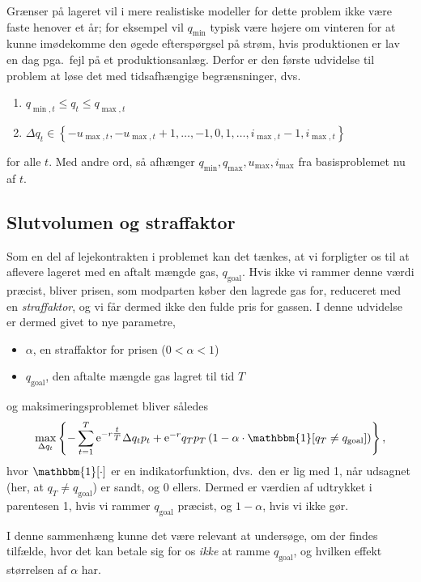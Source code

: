 \documentclass[12pt,oneside,final]{article}
\newcommand{\1}{\mathbbm{1}}
\newcommand{\e}{\mathrm{e}}
\begin{document}
Grænser på lageret vil i mere realistiske modeller for dette problem ikke være faste henover et år;
for eksempel vil \(q_{\min}\) typisk være højere om vinteren for at kunne imødekomme den øgede efterspørgsel på strøm, hvis produktionen er lav en dag pga.\ fejl på et produktionsanlæg.
Derfor er den første udvidelse til problem at løse det med tidsafhængige begrænsninger, dvs.\
%
\begin{enumerate}
\item \(q_{\min,t} \leq q_{t} \leq q_{\max,t}\)
\item \(\Delta q_{t} \in
    \left\{
    -u_{\max,t} , -u_{\max,t}+1 , \dotsc, -1, 0, 1, \dotsc, i_{\max,t} - 1 , i_{\max,t}
    \right\}\)
\end{enumerate}
%
for alle \(t\).
Med andre ord, så afhænger \(q_{\min}, q_{\max}, u_{\max}, i_{\max}\) fra basisproblemet nu af \(t\).


\subsection{Slutvolumen og straffaktor}

Som en del af lejekontrakten i problemet kan det tænkes, at vi forpligter os til at aflevere lageret med en aftalt mængde gas, \(q_{\mathrm{goal}}\).
Hvis ikke vi rammer denne værdi præcist, bliver prisen, som modparten køber den lagrede gas for, reduceret med en \emph{straffaktor}, og vi får dermed ikke den fulde pris for gassen.
I denne udvidelse er dermed givet to nye parametre,
%
\begin{itemize}
\item \(\alpha\), en straffaktor for prisen (\(0 < \alpha < 1\))
\item \(q_{\mathrm{goal}}\), den aftalte mængde gas lagret til tid \(T\)
\end{itemize}
%
og maksimeringsproblemet bliver således
%
\begin{equation}
  \max_{\Delta q_{t}}
  \left\{
    - \sum_{t = 1}^{T} \e^{-r\tfrac{t}{T}} \Delta q_{t} p_{t} + \e^{-r} q_{T}p_{T}
    \left(
      1 - \alpha \cdot \1 [q_{T} \neq q_{\mathrm{goal}}]
    \right)
  \right\} ,
\end{equation}
%
hvor \(\1[\cdot]\) er en indikatorfunktion, dvs.\ den er lig med 1, når udsagnet (her, at \(q_{T} \neq q_{\mathrm{goal}}\)) er sandt, og 0 ellers.
Dermed er værdien af udtrykket i parentesen 1, hvis vi rammer \(q_{\mathrm{goal}}\) præcist, og \(1 - \alpha\), hvis vi ikke gør.

I denne sammenhæng kunne det være relevant at undersøge, om der findes tilfælde, hvor det kan betale sig for os \emph{ikke} at ramme \(q_{\mathrm{goal}}\), og hvilken effekt størrelsen af \(\alpha\) har.
\end{document}
